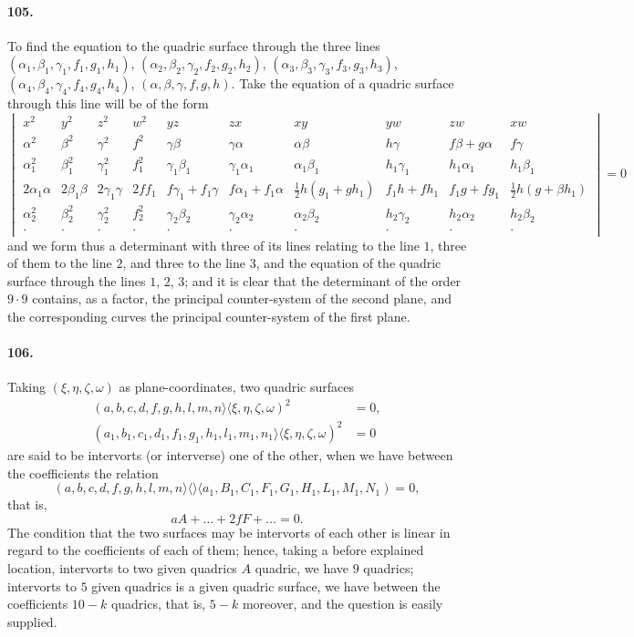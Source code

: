 \documentclass[11pt,a4paper]{article}
\providecommand{\quant}{\mathrel{\rangle\!\langle}}
\begin{document}
\paragraph{105.}
To find the equation to the quadric surface through the three lines
$(\alpha_1, \beta_1, \gamma_1, f_1, g_1, h_1)$, $(\alpha_2, \beta_2, \gamma_2, f_2, g_2, h_2)$,
$(\alpha_3, \beta_3, \gamma_3, f_3, g_3, h_3)$, $(\alpha_4, \beta_4, \gamma_4, f_4, g_4, h_4)$,
$(\alpha, \beta, \gamma, f, g, h)$. Take the equation of a quadric surface through
this line will be of the form
\[
\begin{vmatrix}
x^2 & y^2 & z^2 & w^2 & yz & zx & xy & yw & zw & xw\\
\alpha^2 & \beta^2 & \gamma^2 & f^2 & \gamma\beta & \gamma\alpha & \alpha\beta & h\gamma & f\beta + g\alpha & f\gamma\\
\alpha_1^2 & \beta_1^2 & \gamma_1^2 & f_1^2 & \gamma_1\beta_1 & \gamma_1\alpha_1 & \alpha_1\beta_1 & h_1\gamma_1 & h_1\alpha_1 & h_1\beta_1\\
2\alpha_1\alpha & 2\beta_1\beta & 2\gamma_1\gamma & 2ff_1 & f\gamma_1+f_1\gamma & f\alpha_1+f_1\alpha & \tfrac{1}{2}h(g_1+gh_1) & f_1h+fh_1 & f_1g+fg_1 & \tfrac{1}{2}h(g+\beta h_1)\\
\alpha_2^2 & \beta_2^2 & \gamma_2^2 & f_2^2 & \gamma_2\beta_2 & \gamma_2\alpha_2 & \alpha_2\beta_2 & h_2\gamma_2 & h_2\alpha_2 & h_2\beta_2\\
\cdot & \cdot & \cdot & \cdot & \cdot & \cdot & \cdot & \cdot & \cdot & \cdot
\end{vmatrix} = 0
\]
and we form thus a determinant with three of its lines relating to the line $1$,
three of them to the line $2$, and three to the line $3$, and the equation of the
quadric surface through the lines $1$, $2$, $3$; and it is clear that the
determinant of the order $9 \cdot 9$ contains, as a factor, the principal counter-system
of the second plane, and the corresponding curves the principal counter-system of
the first plane.

\bigskip

\paragraph{106.}
Taking $(\xi, \eta, \zeta, \omega)$ as plane-coordinates, two quadric surfaces
\begin{align*}
(a, b, c, d, f, g, h, l, m, n \quant \xi, \eta, \zeta, \omega)^2 &= 0,\\
(a_1, b_1, c_1, d_1, f_1, g_1, h_1, l_1, m_1, n_1 \quant \xi, \eta, \zeta, \omega)^2 &= 0
\end{align*}
are said to be intervorts (or interverse) one of the other, when we have between the
coefficients the relation
\[
(a, b, c, d, f, g, h, l, m, n \quant\!\quant a_1, B_1, C_1, F_1, G_1, H_1, L_1, M_1, N_1) = 0,
\]
that is,
\[
aA + \ldots + 2fF + \ldots = 0.
\]
The condition that the two surfaces may be intervorts of each other is linear in
regard to the coefficients of each of them; hence, taking a before explained location,
intervorts to two given quadrics $A$ quadric, we have $9$ quadrics; intervorts to $5$
given quadrics is a given quadric surface, we have between the coefficients $10 - k$
quadrics, that is, $5 - k$ moreover, and the question is easily supplied.
\end{document}
